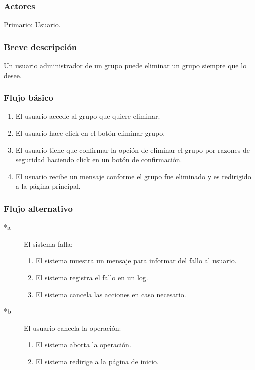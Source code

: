 \documentclass[12pt, a4paper, titlepage]{article}
\begin{document}
\subsubsection{Actores}
Primario: Usuario.

\subsubsection{Breve descripción}
Un usuario administrador de un grupo puede eliminar un grupo siempre que lo desee.
\subsubsection{Flujo básico}
	\begin{enumerate}
		\item El usuario accede al grupo que quiere eliminar.
		\item El usuario hace click en el botón eliminar grupo.
		\item El usuario tiene que confirmar la opción de eliminar el grupo por razones de seguridad haciendo click en un botón de confirmación.
		\item El usuario recibe un mensaje conforme el grupo fue eliminado y es redirigido a la página principal. 
	\end{enumerate}
	
\subsubsection{Flujo alternativo}
	\begin{description}
		\item [*a] El sistema falla:
			\begin{enumerate}
				\item El sistema muestra un mensaje para informar del fallo al usuario.
				\item El sistema registra el fallo en un log.
				\item El sistema cancela las acciones en caso necesario.
			\end{enumerate}
	\end{description}

	\begin{description}
		\item [*b] El usuario cancela la operación:
			\begin{enumerate}
				\item El sistema aborta la operación.
				\item El sistema redirige a la página de inicio.
			\end{enumerate}
	\end{description}
\end{document}
